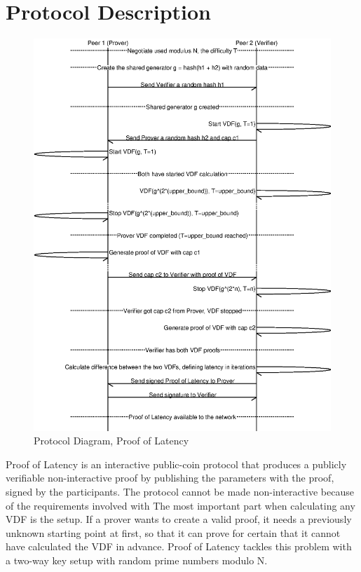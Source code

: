 \section{Protocol Description}
\begin{figure}
	\includegraphics[width=\textwidth]{pictures/pol2_diagram.eps}
	\caption{Protocol Diagram, Proof of Latency}
	\label{PoL Diagram 2}
\end{figure}
Proof of Latency is an interactive public-coin protocol that produces a publicly verifiable non-interactive proof by publishing the parameters with the proof, signed by the participants. The protocol cannot be made non-interactive because of the requirements involved with
The most important part when calculating any VDF is the setup. If a prover wants to create a valid proof, it needs a previously unknown starting point at first, so that it can prove for certain that it cannot have calculated the VDF in advance. Proof of Latency tackles this problem with a two-way key setup with random prime numbers modulo N.

